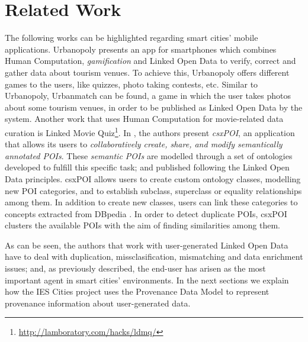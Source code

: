 \section{Related Work}
\label{sec:state_of_the_art}

The following works can be highlighted regarding smart cities' mobile applications. Urbanopoly \cite{celino_urbanopoly_2012} presents an app for smartphones which combines Human Computation, \textit{gamification} and Linked Open Data to verify, correct and gather data about tourism venues. To achieve this, Urbanopoly offers different games to the users, like quizzes, photo taking contests, etc. Similar to Urbanopoly, Urbanmatch \cite{celino_urbanmatch_2012} can be found, a game in which the user takes photos about some tourism venues, in order to be published as Linked Open Data by the system. Another work that uses Human Computation for movie-related data curation is Linked Movie Quiz\footnote{\url{http://lamboratory.com/hacks/ldmq/}}. In \cite{braun_collaborative_2007}, the authors present \textit{csxPOI}, an application that allows its users to \textit{collaboratively create, share, and modify semantically annotated POIs}. These \textit{semantic POIs} are modelled through a set of ontologies developed to fulfill this specific task; and published following the Linked Open Data principles. csxPOI allows users to create custom ontology classes, modelling new POI categories, and to establish subclass, superclass or equality relationships among them. In addition to create new classes, users can link these categories to concepts extracted from DBpedia \cite{auer_dbpedia:_2007}. In order to detect duplicate POIs, csxPOI clusters the available POIs with the aim of finding similarities among them.

As can be seen, the authors that work with user-generated Linked Open Data have to deal with duplication, missclasification, mismatching and data enrichment issues; and, as previously described, the end-user has arisen as the most important agent in smart cities' environments. In the next sections we explain how the IES Cities project uses the Provenance Data Model to represent provenance information about user-generated data.
